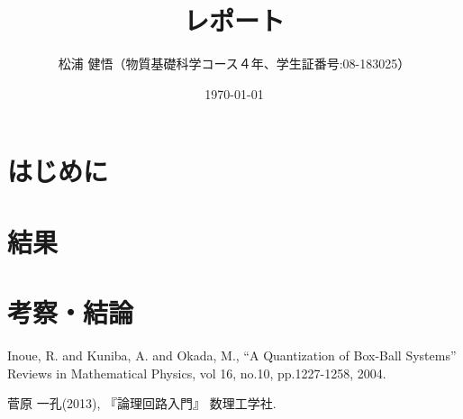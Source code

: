 \documentclass{jsreport}
\begin{document}
\title{レポート}
\author{松浦 健悟（物質基礎科学コース４年、学生証番号:08-183025）}
\date{\today}
\maketitle

\section{はじめに}

\section{}
\section{}

\section{結果}


\section{考察・結論}

\begin{thebibliography}{}
  \bibitem{} Inoue, R. and Kuniba, A. and Okada, M.,
    ``A Quantization of Box-Ball Systems'' Reviews in Mathematical Physics,
    vol 16, no.10, pp.1227-1258, 2004.

  \bibitem{} 菅原 一孔(2013),
   『論理回路入門』 数理工学社.

\end{thebibliography}
\end{document}
